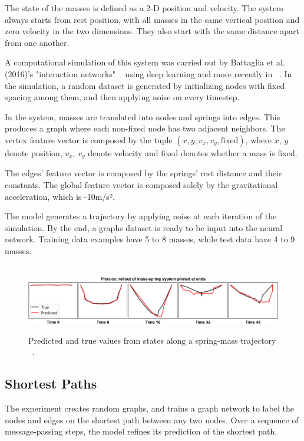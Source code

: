 The state of the masses is defined as a 2-D position and velocity. The system always starts from rest position, with all masses in the same vertical position and zero velocity in the two dimensions. They also start with the same distance apart from one another.

A computational simulation of this system was carried out by Battaglia et al. (2016)'s "interaction networks" ~\cite{Bataglia_2016} using deep learning and more recently in ~\cite{Battaglia_2018}. In the simulation, a random dataset is generated by initializing nodes with fixed spacing among them, and then applying noise on every timestep.

In the system, masses are translated into nodes and springs into edges. This produces a graph where each non-fixed node has two adjacent neighbors. The vertex feature vector is composed by the tuple $(x, y, v_x, v_y, \text{fixed})$, where $x$, $y$ denote position, $v_x$, $v_y$ denote velocity and fixed denotes whether a mass is fixed.

The edges’ feature vector is composed by the springs’ rest distance and their constants. The global feature vector is composed solely by the gravitational acceleration, which is -10m/s².

The model generates a trajectory by applying noise at each iteration of the simulation. By the end, a graphs dataset is ready to be input into the neural network. Training data examples have 5 to 8 masses, while test data have 4 to 9 masses.

\begin{figure}[!htb]
    \centering
    \includegraphics[height=3.0cm]{fig/content/analysed_problems/physics/tragectory.png}
    \caption{Predicted and true values from states along a spring-mass trajectory ~\cite{Battaglia_2018}.}
\end{figure}


\subsection{Shortest Paths}

The experiment creates random graphs, and trains a graph network to label the nodes and edges on the shortest path between any two nodes. Over a sequence of message-passing steps, the model refines its prediction of the shortest path.

